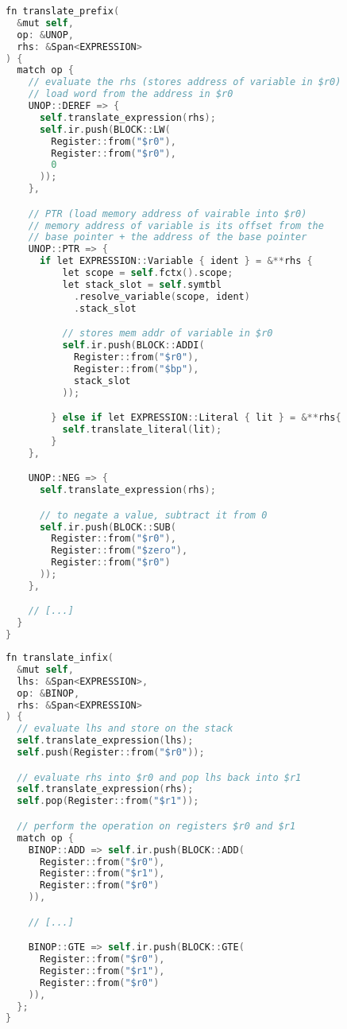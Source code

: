 \begin{lstlisting}[language=C]
fn translate_prefix(
  &mut self, 
  op: &UNOP, 
  rhs: &Span<EXPRESSION>
) {
  match op {
    // evaluate the rhs (stores address of variable in $r0)
    // load word from the address in $r0
    UNOP::DEREF => {
      self.translate_expression(rhs);
      self.ir.push(BLOCK::LW(
        Register::from("$r0"), 
        Register::from("$r0"), 
        0
      ));
    },

    // PTR (load memory address of vairable into $r0)
    // memory address of variable is its offset from the 
    // base pointer + the address of the base pointer
    UNOP::PTR => {
      if let EXPRESSION::Variable { ident } = &**rhs {
          let scope = self.fctx().scope;
          let stack_slot = self.symtbl
            .resolve_variable(scope, ident)
            .stack_slot

          // stores mem addr of variable in $r0
          self.ir.push(BLOCK::ADDI(
            Register::from("$r0"), 
            Register::from("$bp"), 
            stack_slot
          ));

        } else if let EXPRESSION::Literal { lit } = &**rhs{
          self.translate_literal(lit);
        }
    },

    UNOP::NEG => {
      self.translate_expression(rhs);

      // to negate a value, subtract it from 0
      self.ir.push(BLOCK::SUB(
        Register::from("$r0"), 
        Register::from("$zero"),
        Register::from("$r0")
      ));
    },

    // [...]
  }
}
\end{lstlisting}

\begin{lstlisting}[language=C]
fn translate_infix(
  &mut self, 
  lhs: &Span<EXPRESSION>, 
  op: &BINOP, 
  rhs: &Span<EXPRESSION>
) {
  // evaluate lhs and store on the stack
  self.translate_expression(lhs);
  self.push(Register::from("$r0"));

  // evaluate rhs into $r0 and pop lhs back into $r1
  self.translate_expression(rhs);
  self.pop(Register::from("$r1"));

  // perform the operation on registers $r0 and $r1
  match op {
    BINOP::ADD => self.ir.push(BLOCK::ADD(
      Register::from("$r0"), 
      Register::from("$r1"), 
      Register::from("$r0")
    )),

    // [...] 

    BINOP::GTE => self.ir.push(BLOCK::GTE(
      Register::from("$r0"), 
      Register::from("$r1"), 
      Register::from("$r0")
    )),
  };
}
\end{lstlisting}

